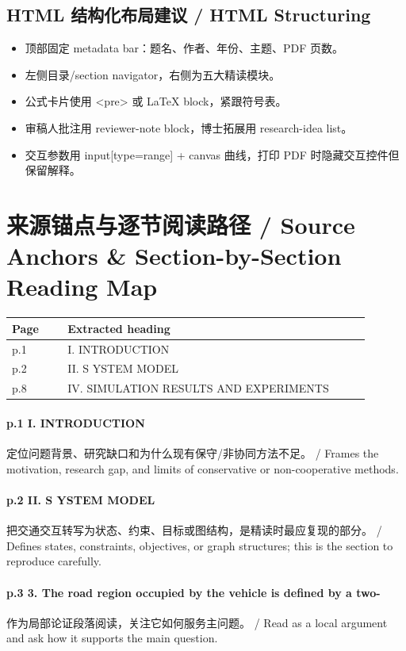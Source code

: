 \documentclass[UTF8,a4paper,11pt,fontset=fandol]{ctexart}
\begin{document}
\subsection{HTML 结构化布局建议 / HTML Structuring}
\begin{itemize}
\item 顶部固定 metadata bar：题名、作者、年份、主题、PDF 页数。
\item 左侧目录/section navigator，右侧为五大精读模块。
\item 公式卡片使用 <pre> 或 LaTeX block，紧跟符号表。
\item 审稿人批注用 reviewer-note block，博士拓展用 research-idea list。
\item 交互参数用 input[type=range] + canvas 曲线，打印 PDF 时隐藏交互控件但保留解释。
\end{itemize}


\section{来源锚点与逐节阅读路径 / Source Anchors \& Section-by-Section Reading Map}
\begin{longtable}{p{0.14\linewidth}p{0.76\linewidth}}
\toprule
Page & Extracted heading\\
\midrule
p.1 & I. INTRODUCTION \\
p.2 & II. S YSTEM MODEL \\
p.8 & IV. SIMULATION RESULTS AND EXPERIMENTS \\
\bottomrule
\end{longtable}

\paragraph{p.1 I. INTRODUCTION}定位问题背景、研究缺口和为什么现有保守/非协同方法不足。 / Frames the motivation, research gap, and limits of conservative or non-cooperative methods.

\paragraph{p.2 II. S YSTEM MODEL}把交通交互转写为状态、约束、目标或图结构，是精读时最应复现的部分。 / Defines states, constraints, objectives, or graph structures; this is the section to reproduce carefully.

\paragraph{p.3 3. The road region occupied by the vehicle is deﬁned by a two-}作为局部论证段落阅读，关注它如何服务主问题。 / Read as a local argument and ask how it supports the main question.
\end{document}
